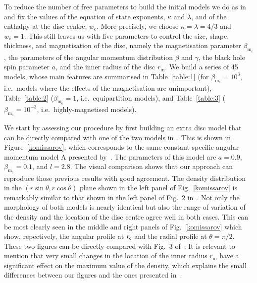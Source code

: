 \documentclass[referee]{aa}
\begin{document}
To reduce the number of free parameters to build the initial models we do as in~\citet{Komissarov:2006} and fix the values of the equation of state exponents, $\kappa$ and $\lambda$, and of the enthalpy at the disc centre, $w_{\mathrm{c}}$. More precisely, we choose $\kappa = \lambda = 4/3$ and $w_{\mathrm{c}} = 1$. This still leaves us with five parameters to control the size, shape, thickness, and magnetisation of the disc, namely the magnetisation parameter $\beta_{\mathrm{m}_{\mathrm{c}}}$, the parameters of the angular momentum distribution $\beta$ and $\gamma$, the black hole spin parameter $a$, and the inner radius of the disc $r_{\mathrm{in}}$. We build a series of 45 models, whose main features are summarised in Table~\ref{table:1} (for $\beta_{\mathrm{m}_{\mathrm{c}}} = 10^{3}$, i.e.~models where the effects of the magnetisation are unimportant), Table~\ref{table:2} ($\beta_{\mathrm{m}_{\mathrm{c}}} = 1$, i.e.~equipartition models), and Table~\ref{table:3} ($\beta_{\mathrm{m}_{\mathrm{c}}} = 10^{-3}$, i.e.~highly-magnetised models).

We start by assessing our procedure by first building an extra disc model that can be directly compared with one of the two models in~\citet{Komissarov:2006}. This is shown in Figure~\ref{komissarov}, which corresponds to the same constant specific angular momentum model A presented by~\citet{Komissarov:2006}. The parameters of this model are $a=0.9$, $\beta_{\mathrm{m}_{\mathrm{c}}}=0.1$, and $l=2.8$.
The visual comparison shows that our approach can reproduce those previous results with good agreement. The density distribution in the $(r\sin\theta,r\cos\theta)$ plane shown in the left panel of Fig.~\ref{komissarov} is remarkably similar to that shown in the left panel of Fig.~2 in~\citet{Komissarov:2006}. Not only the morphology of both models is nearly identical but also the range of variation of the density and the location of the disc centre agree well in both cases. This can be most clearly seen in the middle and right panels of Fig.~\ref{komissarov} which show, repectively, the angular profile at $r_{\rm c}$ and the radial profile at $\theta=\pi/2$. These two figures can be directly compared with Fig.~3 of~\citet{Komissarov:2006}. It is relevant to mention that very small changes in the location of the inner radius $r_{\mathrm{in}}$ have a significant effect on the maximum value of the density, which explains the small differences between our figures and the ones presented in~\citet{Komissarov:2006}.
\end{document}
